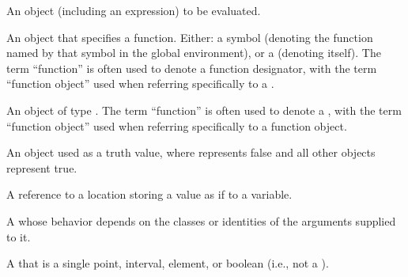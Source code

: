 \documentclass[10pt,twoside,english,pdftex]{article}
\begin{document}
\begin{glossary-list}

\glent[form]
%
%
%
%
An object (including an expression) to be evaluated.


%
%
%
%
An object that specifies a function.  Either: a symbol (denoting the function
named by that symbol in the global environment), or a 
(denoting itself).  The term ``function'' is often used to denote a
function designator, with the term ``function object'' used when referring
specifically to a .


An object of type .  The term ``function'' is often
used to denote a , with the term ``function
object'' used when referring specifically to a function object.


%
%
An object used as a truth value, where \nil{} represents false and all other
objects represent true.


%
%
A reference to a location storing a value as if to a variable.


%
A  whose behavior depends on the classes or identities of the
arguments supplied to it.


%
%
A  that is a single point, interval, element, or
boolean (i.e., not a ).


\end{glossary-list}
\end{document}
